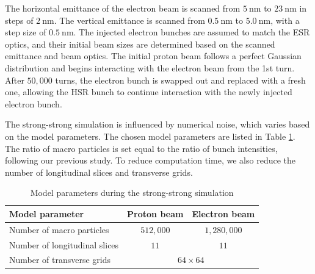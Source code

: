 \documentclass{article}
\begin{document}
The horizontal emittance of the electron beam is scanned from $5~\mathrm{nm}$ to 
$23~\mathrm{nm}$ in steps of $2~\mathrm{nm}$. The vertical emittance is scanned 
from $0.5~\mathrm{nm}$ to $5.0~\mathrm{nm}$, with a step size of $0.5~\mathrm{nm}$. 
The injected electron bunches are assumed to match the ESR optics, and their initial 
beam sizes are determined based on the scanned emittance and beam optics. 
The initial proton beam follows a perfect Gaussian distribution and begins interacting 
with the electron beam from the 1st turn. After $50,000$ turns, the electron bunch 
is swapped out and replaced with a fresh one, allowing the HSR bunch to 
continue interaction with the newly injected electron bunch.

The strong-strong simulation is influenced by numerical noise, which varies based on 
the model parameters. The chosen model parameters are listed in Table \ref{tab:model}.
The ratio of macro particles is set equal to the ratio of bunch intensities, 
following our previous study. To reduce computation time, we also reduce the 
number of longitudinal slices and transverse grids.
\begin{table}
    \centering
    \caption{Model parameters during the strong-strong simulation\\}
    \begin{tabular}{lcc}
    \toprule
    Model parameter & Proton beam & Electron beam\\
    \midrule
    Number of macro particles & $512,000$ & $1,280,000$\\
    Number of longitudinal slices & $11$ & $11$\\
    Number of transverse grids & \multicolumn{2}{c}{$64\times 64$}\\
    \bottomrule
    \end{tabular}
    \label{tab:model}
\end{table}

\end{document}
